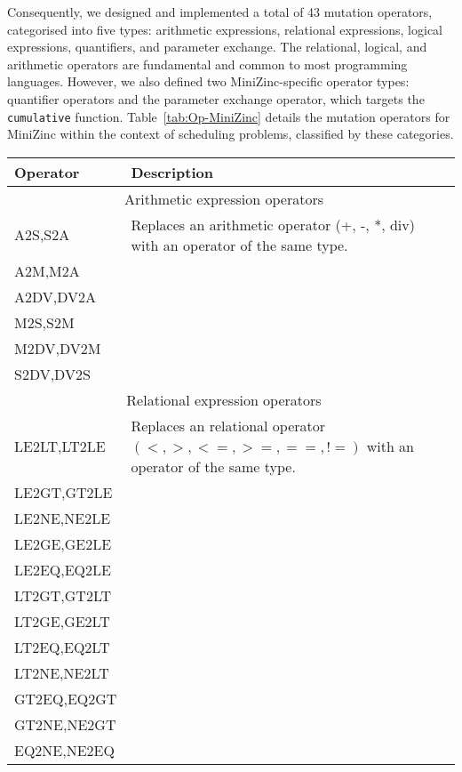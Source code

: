 Consequently, we designed and implemented a total of 43 mutation operators, categorised into five types: arithmetic expressions, relational expressions, logical expressions, quantifiers, and parameter exchange. The relational, logical, and arithmetic operators are fundamental and common to most programming languages. However, we also defined two MiniZinc-specific operator types: quantifier operators and the parameter exchange operator, which targets the \texttt{cumulative} function. Table~\ref{tab:Op-MiniZinc} details the mutation operators for MiniZinc within the context of scheduling problems, classified by these categories.

\begin{table*}[htb!]
    \caption{Mutation operators for MiniZinc with scheduling problems}
    \label{tab:Op-MiniZinc}
    \centering
    \small
    \begin{tabular}{l p{}r}
    \toprule
      Operator & \hspace{3cm} Description \\
     \midrule
     \multicolumn{2}{c}{Arithmetic expression operators} \\
     \midrule
     A2S,S2A & Replaces an arithmetic operator (+, -, *, div) with an operator of the same type.\\
     A2M,M2A\\
     A2DV,DV2A\\
     M2S,S2M\\
     M2DV,DV2M\\
     S2DV,DV2S\\
     \midrule
     \multicolumn{2}{c}{Relational expression operators} \\
     \midrule
     LE2LT,LT2LE & Replaces an relational operator $(<, >, <=, >=, ==, !=)$ with an operator of the same type.\\
     LE2GT,GT2LE\\
     LE2NE,NE2LE \\
     LE2GE,GE2LE \\
     LE2EQ,EQ2LE\\
     LT2GT,GT2LT\\
     LT2GE,GE2LT\\
     LT2EQ,EQ2LT\\
     LT2NE,NE2LT\\
     GT2EQ,EQ2GT\\
     GT2NE,NE2GT\\
     EQ2NE,NE2EQ\\


\end{tabular}
\end{table*}

